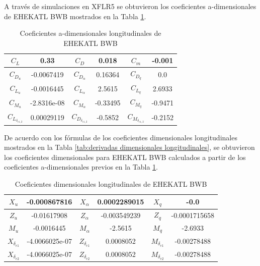 A través de simulaciones en XFLR5 se obtuvieron los coeficientes a-dimensionales de EHEKATL BWB mostrados en la Tabla \ref{Coeficientes a-dimensionales longitudinales de EHEKATL BWB}. 
\begin{table}[!h]
    \centering
    \begin{tabular}{|cc|cc|cc|}
    \hline
     $C_L$ & 0.33 & $C_D$ & 0.018 & $C_m$ & -0.001 \\
     \hline
     $C_{D_u}$ & -0.0067419 & $C_{D_\alpha}$ & 0.16364 & $C_{D_q}$ & 0.0 \\
     \hline
     $C_{L_u}$ & -0.0016445 & $C_{L_\alpha}$ & 2.5615 & $C_{L_q}$ & 2.6933 \\
     \hline
     $C_{M_u}$ & -2.8316e-08 & $C_{M_\alpha}$ & -0.33495 & $C_{M_q}$ & -0.9471 \\
     \hline
     $C_{L_{\delta_{e1,2}}}$ & 0.00029119 & $C_{D_{\delta_{e1,2}}}$ & -0.5852 & $C_{M_{\delta_{e1,2}}}$ & -0.2152 \\
     \hline
    \end{tabular}
    \caption{Coeficientes a-dimensionales longitudinales de EHEKATL BWB}
    \label{Coeficientes a-dimensionales longitudinales de EHEKATL BWB}
\end{table}

De acuerdo con los fórmulas de los coeficientes dimensionales longitudinales mostrados en la Tabla \ref{tab:derivadas dimensionales longitudinales}, se obtuvieron los coeficientes dimensionales para EHEKATL BWB calculados a partir de los coeficientes a-dimensionales previos en la Tabla \ref{Coeficientes a-dimensionales longitudinales de EHEKATL BWB}. 

\begin{table}[!h]
    \centering
    \begin{tabular}{|cc|cc|cc|}
    \hline
     $X_u$ & -0.000867816 & $X_\alpha$ & 0.0002289015 & $X_q$ & -0.0 \\
     \hline
     $Z_u$ & -0.01617908 & $Z_\alpha$ & -0.003549239 & $Z_q$ & -0.0001715658 \\
     \hline
     $M_u$ & -0.0016445 & $M_\alpha$ & -2.5615 & $M_q$ & -2.6933 \\
     \hline
     $X_{\delta_{e1}}$ & -4.0066025e-07 & $Z_{\delta_{e1}}$ & 0.0008052 & $M_{\delta_{e1}}$ & -0.00278488 \\
     \hline
     $X_{\delta_{e2}}$ & -4.0066025e-07 & $Z_{\delta_{e2}}$ & 0.0008052 & $M_{\delta_{e2}}$ & -0.00278488 \\
     \hline
    \end{tabular}
    \caption{Coeficientes dimensionales longitudinales de EHEKATL BWB}
    \label{Coeficientes dimensionales longitudinales de EHEKATL BWB}
\end{table}

